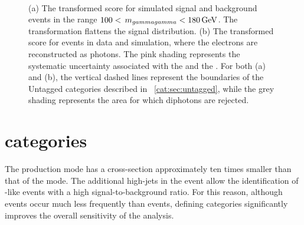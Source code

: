\begin{figure}[h]
\centering
\\
\caption{ (a) The transformed \DiPhoBdt score for simulated signal and background events in the range $100 < \,m_{gammagamma} < 180\,\text{Ge\hspace{-.08em}V}$. The transformation flattens the signal distribution. (b) The transformed \DiPhoBdt score for \Zee events in data and simulation, where the electrons are reconstructed as photons. The pink shading represents the systematic uncertainty associated with the \PhoIdBdt and the \PhoEnergyBdt. For both (a) and (b), the vertical dashed lines represent the boundaries of the Untagged categories described in \Sec~\ref{cat:sec:untagged}, while the grey shading represents the area for which diphotons are rejected.}
\label{fig:cat:diphobdt}
\end{figure}

\section{\VBFTag categories }
\label{cat:sec:vbftag}

The \VBF production mode has a cross-section approximately ten times smaller than that of the \ggH mode. The additional high-\pT jets in the event allow the identification of \VBF-like events with a high signal-to-background ratio. For this reason, although \VBF events occur much less frequently than \ggH events, defining \VBFTag categories significantly improves the overall sensitivity of the analysis.

